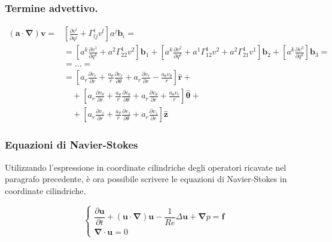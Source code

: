  \subsubsection{Termine advettivo.}
 \begin{equation}
  \begin{aligned}
   (\bm{a} \cdot \bm{\nabla}) \bm{v} = & \left[ \frac{\partial v^i}{\partial q^j} +\Gamma_{lj}^i v^l \right] a^j \bm{b}_i = \\
     & = \left[  a^k \frac{\partial v^1}{\partial q^k} + a^2 \Gamma_{22}^1 v^2 \right] \bm{b}_1 + 
       \left[  a^k \frac{\partial v^2}{\partial q^k} + a^1 \Gamma_{12}^1 v^2 + a^2 \Gamma_{21}^1 v^1 \right] \bm{b}_2 + 
       \left[  a^k \frac{\partial v^3}{\partial q^k} \right] \bm{b}_3 = \\
     & = \dots =  \\
     & = \left[ a_r \frac{\partial v_r}{\partial r} + \frac{a_\theta}{r}\frac{\partial v_r}{\partial \theta} +
                a_r \frac{\partial v_r}{\partial r} - \frac{a_\theta v_\theta}{r}\right] \bm{\hat{r}} + \\
       & \quad  + \left[ a_r \frac{\partial v_\theta}{\partial r} + \frac{a_\theta}{r}\frac{\partial v_\theta}{\partial \theta} +
                a_r \frac{\partial v_\theta}{\partial r} + \frac{a_\theta v_r}{r}\right] \bm{\hat{\theta}} + \\
       & \quad  + \left[ a_r \frac{\partial v_z}{\partial r} + \frac{a_\theta}{r}\frac{\partial v_z}{\partial \theta} +
                a_r \frac{\partial v_z}{\partial r} \right] \bm{\hat{z}}  
  \end{aligned}
 \end{equation}
 
 
 \subsubsection{Equazioni di Navier-Stokes}
 Utilizzando l'espressione in coordinate cilindriche degli operatori ricavate nel paragrafo precedente, è ora possibile
 scrivere le equazioni di Navier-Stokes in coordinate cilindriche.
 
\begin{equation}
\begin{cases}
 \dfrac{\partial \bm{u}}{\partial t} + \left( \bm{u} \cdot \bm{\nabla} \right) \bm{u} - \dfrac{1}{Re} \Delta \bm{u} + \bm{\nabla} p = \bm{f} \\
 \bm{\nabla} \cdot \bm{u} = 0
\end{cases}
\end{equation}

